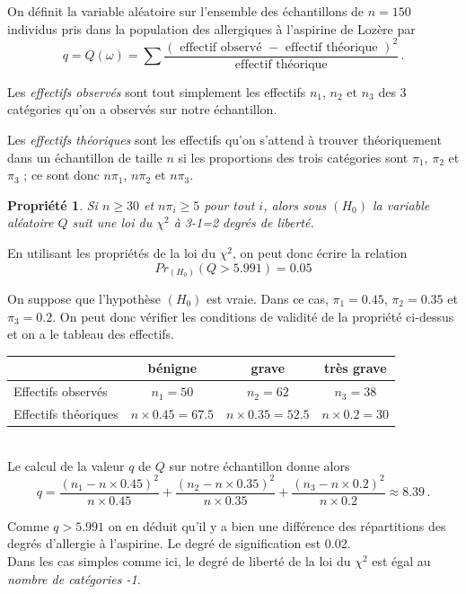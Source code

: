 \documentclass[12pt, a4paper]{book}
\newtheorem{prop}[thm]{Propriété}
\numberwithin{equation}{section}
\begin{document}
On définit la variable aléatoire sur l'ensemble des échantillons de $n=150$ individus pris dans la population
des  allergiques à l'aspirine de Lozère par  
$$
q = Q(\omega)=\sum\frac{ ({\mbox { effectif observé }} -  {\mbox { effectif théorique }})^2}
 { {\mbox { effectif théorique }}} \,.
$$

Les {\it effectifs observés} sont tout simplement les effectifs $n_1$, $n_2$ et $n_3$ des 3 catégories 
qu'on a  observés sur notre échantillon.
 
Les {\it effectifs théoriques} sont les effectifs qu'on s'attend à trouver théoriquement dans un 
échantillon de taille $n$ si les proportions des trois catégories sont $\pi_1$, $\pi_2$ et $\pi_3$ ;  ce sont
donc $n\pi_1$, $n\pi_2$ et $n\pi_3$. 

\begin{prop}
Si $n\geq 30$ et $n\pi_i \geq 5$ pour tout $i$, alors sous $(H_0)$ la variable aléatoire $Q$ suit une loi du $\chi^2$
à 3-1=2 degrés de liberté.
\end{prop}

En utilisant les propriétés de la loi du $\chi^2$, on peut donc écrire la relation
$$
Pr_{(H_0)}(Q > 5.991) = 0.05
$$

On suppose que l'hypothèse $(H_0)$ est vraie. Dans ce cas, $\pi_1=0.45$, $\pi_2=0.35$ et $\pi_3=0.2$.
On peut donc vérifier les conditions de validité de la propriété ci-dessus et on a le tableau des effectifs.\\

\begin{tabular}{|l|c|c|c|}
\hline
        & bénigne & grave & très grave\\
\hline
Effectifs observés & $n_1=50$ & $n_2=62$ & $n_3=38$ \\
\hline
Effectifs théoriques & $n\times 0.45=67.5$ & $n\times 0.35=52.5$ & $n\times 0.2=30$ \\
\hline
\end{tabular}
\\

Le calcul de la valeur $q$ de $Q$ sur notre échantillon donne alors
$$
q = \frac{(n_1 - n\times 0.45)^2}{n\times 0.45} + \frac{(n_2 - n\times 0.35)^2}{n\times 0.35}
+ \frac{(n_3 - n\times 0.2)^2}{n\times 0.2} \approx 8.39\,.
$$

Comme $q>5.991$ on en déduit qu'il y a bien une différence des répartitions des degrés d'allergie à
l'aspirine. Le degré de signification est 0.02. \\

 Dans les cas simples comme ici, le degré de liberté de la loi du $\chi^2$ est
égal au {\it nombre de catégories -1.} 
\end{document}
